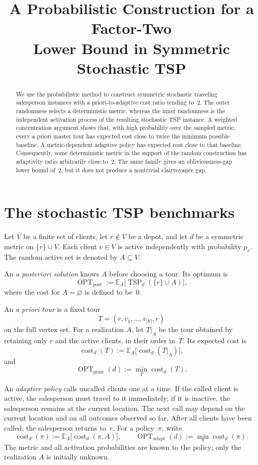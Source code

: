 \documentclass[11pt]{article}
\title{A Probabilistic Construction for a Factor-Two\\
Lower Bound in Symmetric Stochastic TSP}
\author{}
\date{}
\theoremstyle{remark}
\newcommand{\E}{\mathbb{E}}
\newcommand{\cost}{\operatorname{cost}}
\newcommand{\optpost}{\operatorname{OPT}_{\mathrm{post}}}
\newcommand{\optadapt}{\operatorname{OPT}_{\mathrm{adapt}}}
\newcommand{\optprior}{\operatorname{OPT}_{\mathrm{prior}}}
\begin{document}
\maketitle

\begin{abstract}
We use the probabilistic method to construct symmetric stochastic traveling
salesperson instances with a priori-to-adaptive cost ratio tending to~$2$.
The outer randomness selects a deterministic metric, whereas the inner
randomness is the independent activation process of the resulting stochastic
TSP instance.  A weighted concentration argument shows that, with high
probability over the sampled metric, every a priori master tour has expected
cost close to twice the minimum possible baseline.  A metric-dependent
adaptive policy has expected cost close to that baseline.  Consequently, some
deterministic metric in the support of the random construction has adaptivity
ratio arbitrarily close to~$2$.  The same family gives an obliviousness-gap
lower bound of~$2$, but it does not produce a nontrivial clairvoyance gap.
\end{abstract}

\section{The stochastic TSP benchmarks}

Let $V$ be a finite set of clients, let $r\notin V$ be a depot, and let
$d$ be a symmetric metric on $\{r\}\cup V$.  Each client $v\in V$ is active
independently with probability $p_v$.  The random active set is denoted by
$A\subseteq V$.

An \emph{a posteriori solution} knows $A$ before choosing a tour.  Its optimum
is
\[
    \optpost
    :=
    \E_A\bigl[\operatorname{TSP}_d(\{r\}\cup A)\bigr],
\]
where the cost for $A=\varnothing$ is defined to be~$0$.

An \emph{a priori tour} is a fixed tour
\[
    T=(r,v_1,\ldots,v_{|V|},r)
\]
on the full vertex set.  For a realization $A$, let $T|_A$ be the tour obtained
by retaining only $r$ and the active clients, in their order in~$T$.  Its
expected cost is
\[
    \cost_d(T):=\E_A\bigl[\cost_d(T|_A)\bigr],
\]
and
\[
    \optprior(d):=\min_T \cost_d(T).
\]

An \emph{adaptive policy} calls uncalled clients one at a time.  If the called
client is active, the salesperson must travel to it immediately; if it is
inactive, the salesperson remains at the current location.  The next call may
depend on the current location and on all outcomes observed so far.  After all
clients have been called, the salesperson returns to~$r$.  For a policy~$\pi$,
write
\[
    \cost_d(\pi):=\E_A\bigl[\cost_d(\pi,A)\bigr],
    \qquad
    \optadapt(d):=\min_\pi \cost_d(\pi).
\]
The metric and all activation probabilities are known to the policy; only the
realization $A$ is initially unknown.
\end{document}
